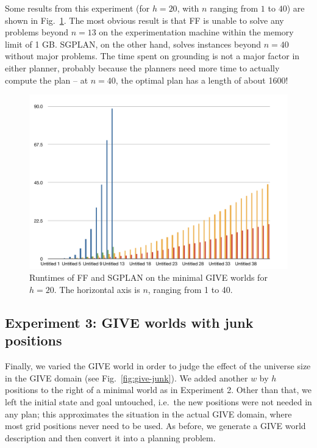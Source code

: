 Some results from this experiment (for $h=20$, with $n$ ranging from
$1$ to $40$) are shown in Fig.~\ref{fig:give-runtime-minimal}.  The
most obvious result is that FF is unable to solve any problems beyond
$n=13$ on the experimentation machine within the memory limit of 1 GB.
SGPLAN, on the other hand, solves instances beyond $n=40$ without
major problems.  The time spent on grounding is not a major factor in
either planner, probably because the planners need more time to
actually compute the plan -- at $n=40$, the optimal plan has a length
of about 1600!

\begin{figure}
  \centering
  \includegraphics[width=1\columnwidth]{pic-runtime-buttons}
  \caption{Runtimes of FF and SGPLAN on the minimal GIVE worlds for $h=20$. The horizontal axis is $n$, ranging from 1 to 40.}
  \label{fig:give-runtime-minimal}
\end{figure}

\subsection{Experiment 3: GIVE worlds with junk positions}
\label{sec:experiment-3:-give}

Finally, we varied the GIVE world in order to judge the effect of the
universe size in the GIVE domain (see Fig.~\ref{fig:give-junk}).  We
added another $w$ by $h$ positions to the right of a minimal world as
in Experiment 2.  Other than that, we left the initial state and goal
untouched, i.e.\ the new positions were not needed in any plan; this
approximates the situation in the actual GIVE domain, where most grid
positions never need to be used.  As before, we generate a GIVE world
description and then convert it into a planning problem.

